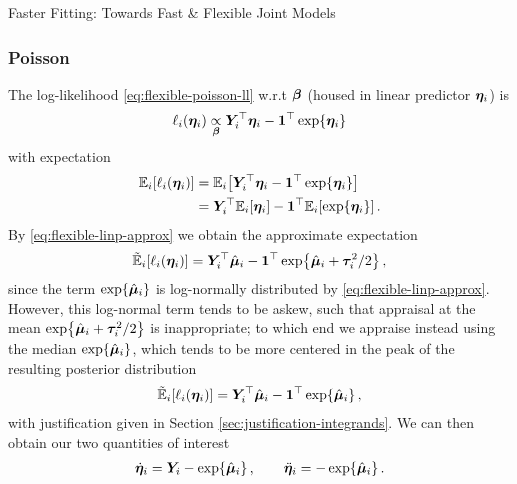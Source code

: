\begin{chapter}{\label{cha:flexible}Faster Fitting: Towards Fast \& Flexible Joint Models}
\subsubsection{Poisson}
The log-likelihood \eqref{eq:flexible-poisson-ll} w.r.t $\bm{\beta}$ (housed in linear predictor $\bm{\eta}_i$) is
\begin{equation*}
    \ell_i\!\left(\bm{\eta}_i\right)\underset{\bm{\beta}}{\propto}\bm{Y}_i^\top\bm{\eta}_i-\bm{1}^\top\exp\!\left\{\bm{\eta}_i\right\}
\end{equation*}
with expectation
\begin{align*}
    \mathbb{E}_i\!\left[\ell_i\!\left(\bm{\eta}_i\right)\right]&=\mathbb{E}_i\!\left[\bm{Y}_i^\top\bm{\eta}_i-\bm{1}^\top\exp\!\left\{\bm{\eta}_i\right\}\right]\\
    &=\bm{Y}_i^\top\mathbb{E}_i\!\left[\bm{\eta}_i\right]-\bm{1}^\top\mathbb{E}_i\!\left[\exp\!\left\{\bm{\eta}_i\right\}\right].
\end{align*}
By \eqref{eq:flexible-linp-approx} we obtain the approximate expectation
\begin{align*}
    \tilde{\mathbb{E}}_i\!\left[\ell_i\!\left(\bm{\eta}_i\right)\right]=\bm{Y}_i^\top\hat{\bm{\mu}}_i-\bm{1}^\top\exp\!\left\{\hat{\bm{\mu}}_i+\bm{\tau}_i^2/2\right\},
\end{align*}
since the term $\exp\!\left\{\hat{\bm{\mu}}_i\right\}$ is log-normally distributed by \eqref{eq:flexible-linp-approx}. However, this log-normal term tends to be askew, such that appraisal at the mean 
$\exp\!\left\{\hat{\bm{\mu}}_i+\bm{\tau}_i^2/2\right\}$ is inappropriate; to which end we appraise instead using the median $\exp\!\left\{\hat{\bm{\mu}}_i\right\}$, which tends to be more centered in the peak of the resulting posterior distribution
\begin{align*}
    \tilde{\mathbb{E}}_i\!\left[\ell_i\!\left(\bm{\eta}_i\right)\right]=\bm{Y}_i^\top\hat{\bm{\mu}}_i-\bm{1}^\top\exp\!\left\{\hat{\bm{\mu}}_i\right\},
\end{align*}
with justification given in Section \ref{sec:justification-integrands}. We can then obtain our two quantities of interest
\begin{align}
    \dot{\bm{\eta}}_i = \bm{Y}_i-\exp\!\left\{\hat{\bm{\mu}}_i\right\},\qquad\ddot{\bm{\eta}}_i=-\exp\!\left\{\hat{\bm{\mu}}_i\right\}.
\label{eq:flexible-Mstep-beta-poisson}
\end{align}


\end{chapter}
